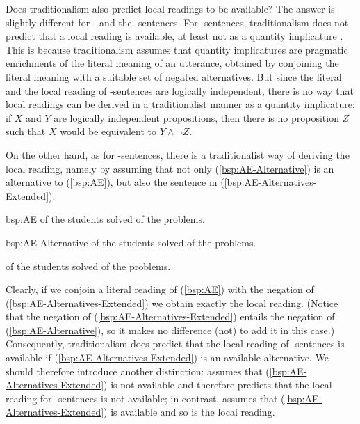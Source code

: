 \documentclass[fleqn,reqno,10pt,draft]{article}
\newcommand{\as}{\acro{as}}
\renewcommand{\es}{\acro{es}}
\begin{document}
Does traditionalism also predict local readings to be available? The
answer is slightly different for \as- and the \es-sentences. For \es-sentences,
traditionalism does not predict that a local reading is available, at
least not as a quantity implicature
\citep[c.f.][]{GeurtsPouscoulous2009:Embedded-Implic,ChemlaSpector2010:Experimental-Ev}. This
is because traditionalism assumes that quantity implicatures are
pragmatic enrichments of the literal meaning of an utterance, obtained
by conjoining the literal meaning with a suitable set of negated
alternatives. But since the literal and the local reading of
\es-sentences are logically independent, there is no way that local
readings can be derived in a traditionalist manner as a quantity
implicature: if $X$ and $Y$ are logically independent propositions,
then there is no proposition $Z$ such that $X$ would be equivalent to
$Y \wedge \neg Z$.

On the other hand, as for \as-sentences, there is a traditionalist way
of deriving the local reading, namely by assuming that not only
(\ref{bsp:AE-Alternative}) is an alternative to (\ref{bsp:AE}), but
also the sentence in (\ref{bsp:AE-Alternatives-Extended}).

\begin{exer}{bsp:AE}
  \ex {} of the students solved  of the problems.
\end{exer}

\begin{exer}{bsp:AE-Alternative}
  \ex {} of the students solved  of the problems.
\end{exer}

\begin{exe}
\ex \label{bsp:AE-Alternatives-Extended}  of the students solved  of the problems.
\end{exe}

\noindent Clearly, if we conjoin a literal reading of (\ref{bsp:AE})
with the negation of (\ref{bsp:AE-Alternatives-Extended}) we obtain
exactly the local reading. (Notice that the negation of
(\ref{bsp:AE-Alternatives-Extended}) entails the negation of
(\ref{bsp:AE-Alternative}), so it makes no difference (not) to add it
in this case.) Consequently, traditionalism does predict that the
local reading of \as-sentences is available if
(\ref{bsp:AE-Alternatives-Extended}) is an available alternative. We
should therefore introduce another distinction:  assumes that (\ref{bsp:AE-Alternatives-Extended}) is
not available and therefore predicts that the local reading for
\as-sentences is not available; in contrast,  assumes that (\ref{bsp:AE-Alternatives-Extended}) is
available and so is the local reading.
\end{document}
